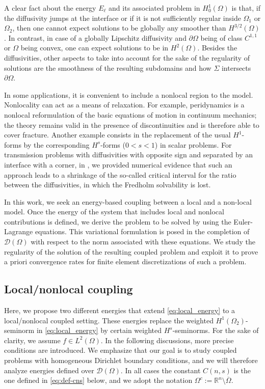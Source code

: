 \documentclass{amsart}
\newcommand{\Ol}{\Omega_{1}}%
\newcommand{\Onl}{\Omega_{2}}%
\def\Om{\Omega}
\def\R{{\mathbb R}}
\theoremstyle{plain}
\numberwithin{equation}{section}
\numberwithin{table}{section}
\numberwithin{figure}{section}
\numberwithin{theorem}{section}
\numberwithin{corollary}{section}
\numberwithin{definition}{section}
\numberwithin{lemma}{section}
\numberwithin{proposition}{section}
\numberwithin{remark}{section}
\begin{document}
A clear fact about the energy $E_\ell$ and its associated problem in $H^1_0(\Omega)$ is that, if the diffusivity jumps at the interface or if it is not sufficiently regular inside $\Ol$ or $\Onl$, then one cannot expect solutions to be globally any smoother than $H^{3/2}(\Omega)$. In contrast, in case of a globally Lipschitz diffusivity and $\partial \Omega$ being of class $C^{1,1}$ or $\Omega$ being convex, one can expect solutions to be in $H^2(\Omega)$. Besides the diffusivities, other aspects to take into account for the sake of the regularity of solutions are the smoothness of the resulting subdomains and how $\Sigma$ intersects $\partial\Omega$.

In some applications, it is convenient to include a nonlocal region to the model. Nonlocality can act as a means of relaxation. For example, peridynamics \cite{Silling} is a nonlocal reformulation of the basic equations of motion in continuum mechanics; the theory remains valid in the presence of discontinuities and is therefore able to cover fracture. Another example consists in the replacement of the usual $H^1$-forms by the corresponding $H^s$-forms ($0<s<1$) in scalar problems. For transmission problems with diffusivities with opposite sign and separated by an interface with a corner, in \cite{BoCi17}, we provided numerical evidence that such an approach leads to a shrinkage of the so-called critical interval for the ratio between the diffusivities, in which the Fredholm solvability is lost.

In this work, we seek an energy-based coupling between a local and a non-local model. Once the energy of the system that includes local and nonlocal contributions is defined, we derive the problem to be solved by using the Euler-Lagrange equations. This variational formulation is posed in the completion of ${\mathcal D}(\Om)$ with respect to the norm associated with these equations. We study the regularity of the solution of the resulting coupled problem and exploit it to prove a priori convergence rates for finite element discretizations of such a problem.

\subsection{Local/nonlocal coupling} \label{sec:l-nl-coupling}
Here, we propose two different energies that extend \eqref{eq:local_energy} to a local/nonlocal coupled setting. These energies replace the weighted $H^1(\Onl)$-seminorm in \eqref{eq:local_energy} by certain weighted $H^s$-seminorms. For the sake of clarity, we assume $f \in L^2(\Omega)$. In the following discussions, more precise conditions are introduced. We emphasize that our goal is to study coupled problems with homogeneous Dirichlet boundary conditions, and we will therefore analyze energies defined over ${\mathcal D}(\Om)$. In all cases the constant $C(n,s)$ is the one defined in \eqref{eq:def-cns} below, and we adopt the notation $\Omega^c := \R^n \setminus \overline \Omega$.
\end{document}

